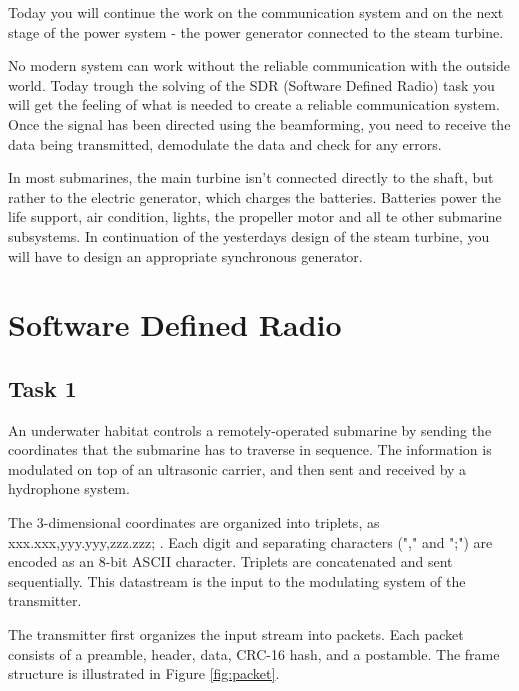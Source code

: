 \documentclass{article}
\begin{document}
Today you will continue the work on the communication system and on the next 
stage of the power system - the power generator connected to the steam turbine.


No modern system can work without the reliable communication with the outside 
world. Today trough the solving of the SDR (Software Defined Radio) task you 
will get the feeling of what is needed to create a reliable communication system.
Once the signal has been directed using the beamforming, you need to receive 
the data being transmitted, demodulate the data and check for any errors.

In most submarines, the main turbine isn't connected directly to the shaft, but 
rather to the electric generator, which charges the batteries.
Batteries power the life support, air condition, lights, the propeller motor 
and 
all te other submarine subsystems. 
In continuation of the yesterdays design of the steam turbine, you will have to 
design an appropriate synchronous generator. 


\section{Software Defined Radio}

\subsection{Task 1}
An underwater habitat controls a remotely-operated submarine by sending the coordinates that the submarine has to traverse in sequence. The information is modulated on top of an ultrasonic carrier, and then sent and received by a hydrophone system.

The 3-dimensional coordinates are organized into triplets, as \textsf{xxx.xxx,yyy.yyy,zzz.zzz;} . Each digit and separating characters ("\textsf{,}" and "\textsf{;}") are encoded as an 8-bit ASCII character. Triplets are concatenated and sent sequentially. This datastream is the input to the modulating system of the transmitter.


The transmitter first organizes the input stream into packets. Each packet consists of a preamble, header, data, CRC-16 hash, and a postamble. The frame structure is illustrated in Figure \ref{fig:packet}.
\end{document}
